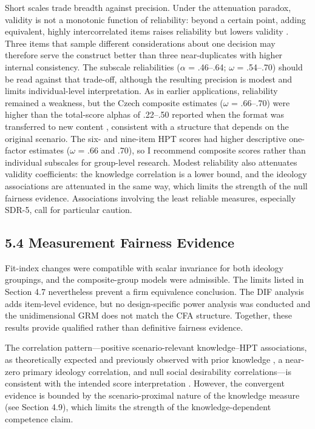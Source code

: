 \documentclass[PCJ,Unicode,screen,mode=plain]{cedram}
\begin{document}
Short scales trade breadth against precision. Under the attenuation paradox,
validity is not a monotonic function of reliability: beyond a certain point,
adding equivalent, highly intercorrelated items raises reliability but lowers
validity \parencites[pp.~493--494, 504]{Loevinger1954Attenuation}[see
also][p.~678]{Loevinger1957Objective}. Three items that sample different
considerations about one decision may therefore serve the construct better than
three near-duplicates with higher internal consistency. The subscale
reliabilities (\(\alpha\) = .46--.64; \(\omega\) = .54--.70) should be read
against that trade-off, although the resulting precision is modest and limits
individual-level interpretation. As in earlier applications, reliability
remained a weakness, but the Czech composite estimates (\(\omega\) = .66--.70)
were higher than the total-score alphas of .22--.50 reported when the format
was transferred to new content
\citep{Huijgen_et_al2014Testing,Wilschut_Schiphorst2019One}, consistent with a
structure that depends on the original scenario. The six- and nine-item HPT
scores had higher descriptive one-factor estimates (\(\omega\) = .66 and .70),
so I recommend composite scores rather than individual subscales for
group-level research. Modest reliability also attenuates validity
coefficients: the knowledge correlation is a lower bound, and the ideology
associations are attenuated in the same way, which limits the strength of the
null fairness evidence. Associations involving the least reliable measures,
especially SDR-5, call for particular caution.

\subsection*{5.4 Measurement Fairness Evidence}\label{measurement-fairness-evidence}

Fit-index changes were compatible with scalar invariance for both
ideology groupings, and the composite-group models were admissible. The
limits listed in Section 4.7 nevertheless prevent a firm equivalence
conclusion. The DIF analysis
adds item-level evidence, but no design-specific power analysis was
conducted and the unidimensional GRM does not match the CFA structure.
Together, these results provide qualified rather than definitive
fairness evidence.

The correlation pattern---positive scenario-relevant knowledge--HPT
associations, as theoretically expected \citep{vanBoxtel_vanDrie2018Historical} and previously observed with prior knowledge \citep{Huijgen_et_al2017Toward}, a near-zero primary ideology correlation, and null social desirability
correlations---is consistent with the intended score interpretation
\citep{AERA2014Standards,Messick1995Validity}. However, the convergent evidence is bounded by the
scenario-proximal nature of the knowledge measure (see Section 4.9),
which limits the strength of the knowledge-dependent competence claim.
\end{document}
